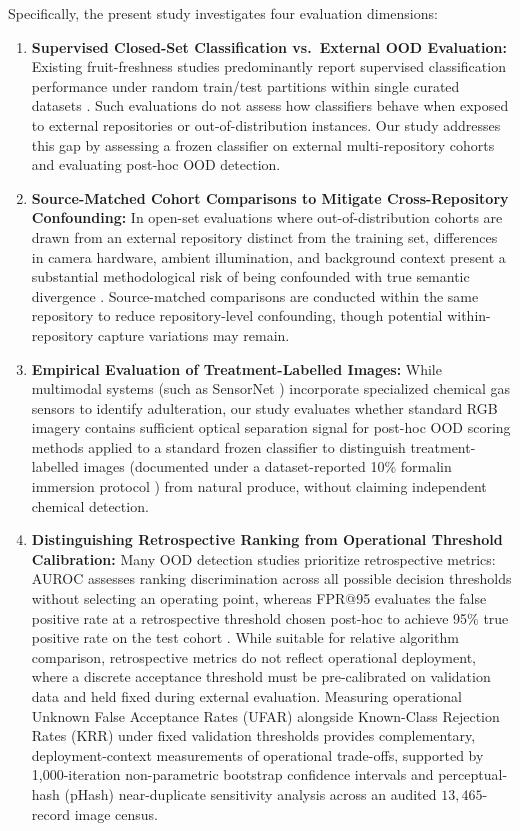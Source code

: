 Specifically, the present study investigates four evaluation dimensions:
\begin{enumerate}
\item \textbf{Supervised Closed-Set Classification vs.\ External OOD Evaluation:} Existing fruit-freshness studies predominantly report supervised classification performance under random train/test partitions within single curated datasets \cite{zhang2024fruit,chen2024classification,gulzar2023fruit,abayomi2024fruitq}. Such evaluations do not assess how classifiers behave when exposed to external repositories or out-of-distribution instances. Our study addresses this gap by assessing a frozen classifier on external multi-repository cohorts and evaluating post-hoc OOD detection.
\item \textbf{Source-Matched Cohort Comparisons to Mitigate Cross-Repository Confounding:} In open-set evaluations where out-of-distribution cohorts are drawn from an external repository distinct from the training set, differences in camera hardware, ambient illumination, and background context present a substantial methodological risk of being confounded with true semantic divergence \cite{yang2024generalized}. Source-matched comparisons are conducted within the same repository to reduce repository-level confounding, though potential within-repository capture variations may remain.
\item \textbf{Empirical Evaluation of Treatment-Labelled Images:} While multimodal systems (such as SensorNet \cite{sattar2024sensornet}) incorporate specialized chemical gas sensors to identify adulteration, our study evaluates whether standard RGB imagery contains sufficient optical separation signal for post-hoc OOD scoring methods applied to a standard frozen classifier to distinguish treatment-labelled images (documented under a dataset-reported 10\% formalin immersion protocol \cite{bijoy2025fruitvision}) from natural produce, without claiming independent chemical detection.
\item \textbf{Distinguishing Retrospective Ranking from Operational Threshold Calibration:} Many OOD detection studies prioritize retrospective metrics: AUROC assesses ranking discrimination across all possible decision thresholds without selecting an operating point, whereas FPR@95 evaluates the false positive rate at a retrospective threshold chosen post-hoc to achieve 95\% true positive rate on the test cohort \cite{hendrycks2017baseline,yang2024generalized,liu2020energy}. While suitable for relative algorithm comparison, retrospective metrics do not reflect operational deployment, where a discrete acceptance threshold must be pre-calibrated on validation data and held fixed during external evaluation. Measuring operational Unknown False Acceptance Rates (UFAR) alongside Known-Class Rejection Rates (KRR) under fixed validation thresholds provides complementary, deployment-context measurements of operational trade-offs, supported by 1,000-iteration non-parametric bootstrap confidence intervals and perceptual-hash (pHash) near-duplicate sensitivity analysis across an audited $13,465$-record image census.
\end{enumerate}
